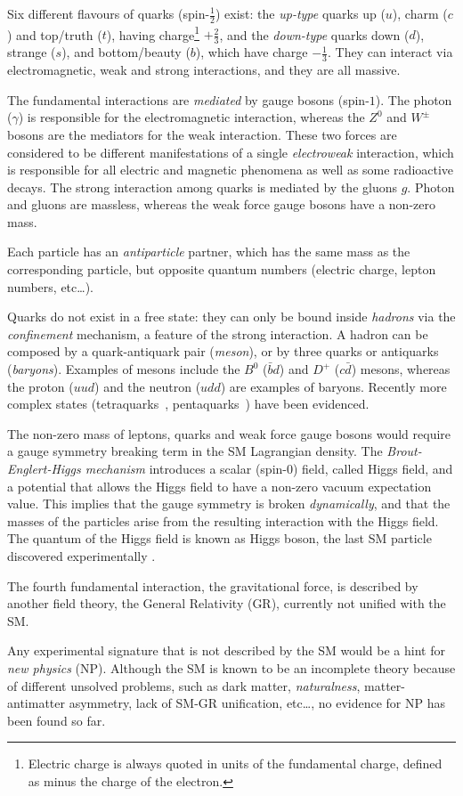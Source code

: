 Six different flavours of quarks (spin-$\frac{1}{2}$) exist: the \emph{up-type} quarks up ($u$), charm ($c$) and  top/truth ($t$), having charge\footnote{Electric charge is always quoted in units of the fundamental charge, defined as minus the charge of the electron.} $+\frac{2}{3}$, and the \emph{down-type} quarks down ($d$), strange ($s$), and bottom/beauty ($b$), which have charge $-\frac{1}{3}$. They can interact via electromagnetic, weak and strong interactions, and they are all massive.

The fundamental interactions are \emph{mediated} by gauge bosons (spin-$1$). The photon ($\gamma$) is responsible for the electromagnetic interaction, whereas the $Z^0$ and $W^\pm$ bosons are the mediators for the weak interaction. These two forces are considered to be different manifestations of a single \emph{electroweak} interaction, which is responsible for all electric and magnetic phenomena as well as some radioactive decays. The strong interaction among quarks is mediated by the gluons $g$. Photon and gluons are massless, whereas the weak force gauge bosons have a non-zero mass.

Each particle has an \emph{antiparticle} partner, which has the same mass as the corresponding particle, but opposite quantum numbers (electric charge, lepton numbers, etc\dots).

Quarks do not exist in a free state: they can only be bound inside \emph{hadrons} via the \emph{confinement} mechanism, a feature of the strong interaction. A hadron can be composed by a quark-antiquark pair (\emph{meson}), or by three quarks or antiquarks (\emph{baryons}). Examples of mesons include the $B^0$ ($\bar b d$) and $D^+$ ($c\bar d$) mesons, whereas the proton ($uud$) and the neutron ($udd$) are examples of baryons. Recently more complex states (tetraquarks~\cite{LHCb-PAPER-2014-014}, pentaquarks~\cite{LHCb-PAPER-2015-029}) have been evidenced.

The non-zero mass of leptons, quarks and weak force gauge bosons would require a gauge symmetry breaking term in the SM Lagrangian density. 
The \emph{Brout-Englert-Higgs mechanism} \cite{BroutEnglert, Higgs, Guralnik} introduces a scalar (spin-$0$) field, called Higgs field, and a potential that allows the Higgs field to have a non-zero vacuum expectation value.
This implies that the gauge symmetry is broken \emph{dynamically}, and that the masses of the particles arise from the resulting interaction with the Higgs field. The quantum of the Higgs field is known as Higgs boson, the last SM particle discovered experimentally \cite{ATLAS, CMS}.

The fourth fundamental interaction, the gravitational force, is described by another field theory, the General Relativity (GR), currently not unified with the SM.

Any experimental signature that is not described by the SM would be a hint for \emph{new physics} (NP). Although the SM is known to be an incomplete theory because of different unsolved problems, such as dark matter, \emph{naturalness}, matter-antimatter asymmetry, lack of SM-GR unification, etc\dots, no evidence for NP has been found so far.
